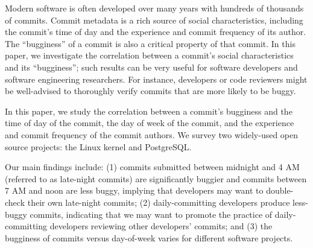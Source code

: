 
Modern software is often developed over many years with hundreds of
thousands of commits. Commit metadata is a rich source of social
characteristics, including the commit's time of day and the
experience and commit frequency of its author.  The ``bugginess'' of a
commit is also a critical property of that commit. In this paper, we
investigate the correlation between a commit's social characteristics
and its ``bugginess''; such results can be very useful for software
developers and software engineering researchers. For instance,
developers or code reviewers might be well-advised to thoroughly
verify commits that are more likely to be buggy.

In this paper, we study the correlation between a commit's bugginess
and the time of day of the commit, the day of week of the commit, and
the experience and commit frequency of the commit authors.  We
survey two widely-used open source projects: the Linux kernel and
PostgreSQL.  

Our main findings include: (1) commits submitted between midnight and
4 AM (referred to as late-night commits) are significantly buggier 
and commits between 7 AM and noon are less buggy, implying that developers 
may want to double-check their own late-night commits; 
(2) daily-committing developers produce less-buggy commits, indicating that we may 
want to promote the practice of daily-committing developers reviewing other 
developers' commits; and (3) the bugginess of
commits versus day-of-week
varies for different software projects.
